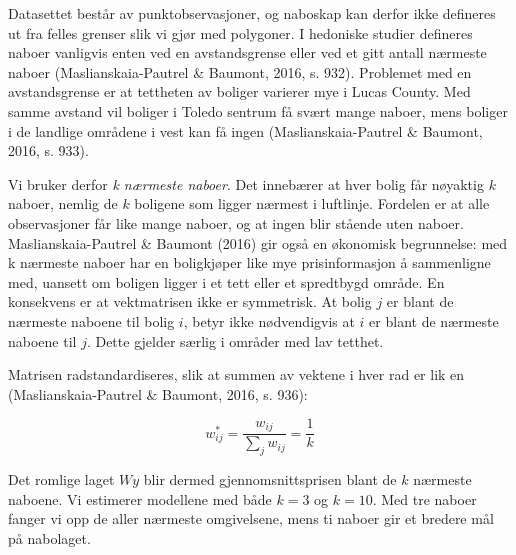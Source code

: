 \documentclass[
  norsk,
  a4paper,
]{article}
\begin{document}
Datasettet består av punktobservasjoner, og naboskap kan derfor ikke
defineres ut fra felles grenser slik vi gjør med polygoner. I hedoniske
studier defineres naboer vanligvis enten ved en avstandsgrense eller ved
et gitt antall nærmeste naboer (Maslianskaia-Pautrel \& Baumont, 2016,
s. 932). Problemet med en avstandsgrense er at tettheten av boliger
varierer mye i Lucas County. Med samme avstand vil boliger i Toledo
sentrum få svært mange naboer, mens boliger i de landlige områdene i
vest kan få ingen (Maslianskaia-Pautrel \& Baumont, 2016, s. 933).

Vi bruker derfor \emph{k nærmeste naboer}. Det innebærer at hver bolig
får nøyaktig \(k\) naboer, nemlig de \(k\) boligene som ligger nærmest i
luftlinje. Fordelen er at alle observasjoner får like mange naboer, og
at ingen blir stående uten naboer. Maslianskaia-Pautrel \& Baumont
(2016) gir også en økonomisk begrunnelse: med k nærmeste naboer har en
boligkjøper like mye prisinformasjon å sammenligne med, uansett om
boligen ligger i et tett eller et spredtbygd område. En konsekvens er at
vektmatrisen ikke er symmetrisk. At bolig \(j\) er blant de nærmeste
naboene til bolig \(i\), betyr ikke nødvendigvis at \(i\) er blant de
nærmeste naboene til \(j\). Dette gjelder særlig i områder med lav
tetthet.

Matrisen radstandardiseres, slik at summen av vektene i hver rad er lik
en (Maslianskaia-Pautrel \& Baumont, 2016, s. 936):

\[w_{ij}^{*} = \frac{w_{ij}}{\sum_j w_{ij}} = \frac{1}{k}\]

Det romlige laget \(Wy\) blir dermed gjennomsnittsprisen blant de \(k\)
nærmeste naboene. Vi estimerer modellene med både \(k = 3\) og
\(k = 10\). Med tre naboer fanger vi opp de aller nærmeste omgivelsene,
mens ti naboer gir et bredere mål på nabolaget.

\begin{table}

\caption{\label{tbl-weights}Oppsummering av vektmatrisene.}


\end{table}%
\end{document}
